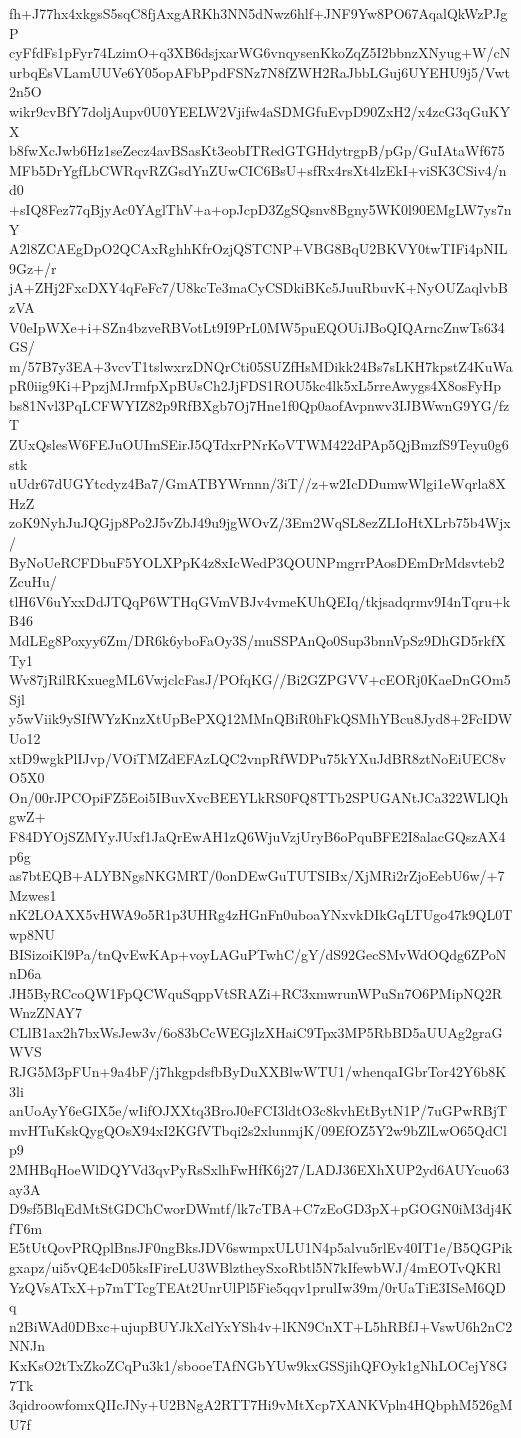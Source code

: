 fh+J77hx4xkgsS5sqC8fjAxgARKh3NN5dNwz6hlf+JNF9Yw8PO67AqalQkWzPJgP
cyFfdFs1pFyr74LzimO+q3XB6dsjxarWG6vnqysenKkoZqZ5I2bbnzXNyug+W/cN
urbqEsVLamUUVe6Y05opAFbPpdFSNz7N8fZWH2RaJbbLGuj6UYEHU9j5/Vwt2n5O
wikr9cvBfY7doljAupv0U0YEELW2Vjifw4aSDMGfuEvpD90ZxH2/x4zcG3qGuKYX
b8fwXcJwb6Hz1seZecz4avBSasKt3eobITRedGTGHdytrgpB/pGp/GuIAtaWf675
MFb5DrYgfLbCWRqvRZGsdYnZUwCIC6BsU+sfRx4rsXt4lzEkI+viSK3CSiv4/nd0
+sIQ8Fez77qBjyAc0YAglThV+a+opJcpD3ZgSQsnv8Bgny5WK0l90EMgLW7ys7nY
A2l8ZCAEgDpO2QCAxRghhKfrOzjQSTCNP+VBG8BqU2BKVY0twTIFi4pNIL9Gz+/r
jA+ZHj2FxcDXY4qFeFc7/U8kcTe3maCyCSDkiBKc5JuuRbuvK+NyOUZaqlvbBzVA
V0eIpWXe+i+SZn4bzveRBVotLt9I9PrL0MW5puEQOUiJBoQIQArncZnwTs634GS/
m/57B7y3EA+3vcvT1tslwxrzDNQrCti05SUZfHsMDikk24Bs7sLKH7kpstZ4KuWa
pR0iig9Ki+PpzjMJrmfpXpBUsCh2JjFDS1ROU5kc4lk5xL5rreAwygs4X8osFyHp
bs81Nvl3PqLCFWYIZ82p9RfBXgb7Oj7Hne1f0Qp0aofAvpnwv3IJBWwnG9YG/fzT
ZUxQslesW6FEJuOUImSEirJ5QTdxrPNrKoVTWM422dPAp5QjBmzfS9Teyu0g6stk
uUdr67dUGYtcdyz4Ba7/GmATBYWrnnn/3iT//z+w2IcDDumwWlgi1eWqrla8XHzZ
zoK9NyhJuJQGjp8Po2J5vZbJ49u9jgWOvZ/3Em2WqSL8ezZLIoHtXLrb75b4Wjx/
ByNoUeRCFDbuF5YOLXPpK4z8xIcWedP3QOUNPmgrrPAosDEmDrMdsvteb2ZcuHu/
tlH6V6uYxxDdJTQqP6WTHqGVmVBJv4vmeKUhQEIq/tkjsadqrmv9I4nTqru+kB46
MdLEg8Poxyy6Zm/DR6k6yboFaOy3S/muSSPAnQo0Sup3bnnVpSz9DhGD5rkfXTy1
Wv87jRilRKxuegML6VwjclcFasJ/POfqKG//Bi2GZPGVV+cEORj0KaeDnGOm5Sjl
y5wViik9ySIfWYzKnzXtUpBePXQ12MMnQBiR0hFkQSMhYBcu8Jyd8+2FcIDWUo12
xtD9wgkPlIJvp/VOiTMZdEFAzLQC2vnpRfWDPu75kYXuJdBR8ztNoEiUEC8vO5X0
On/00rJPCOpiFZ5Eoi5IBuvXvcBEEYLkRS0FQ8TTb2SPUGANtJCa322WLlQhgwZ+
F84DYOjSZMYyJUxf1JaQrEwAH1zQ6WjuVzjUryB6oPquBFE2I8alacGQszAX4p6g
as7btEQB+ALYBNgsNKGMRT/0onDEwGuTUTSIBx/XjMRi2rZjoEebU6w/+7Mzwes1
nK2LOAXX5vHWA9o5R1p3UHRg4zHGnFn0uboaYNxvkDIkGqLTUgo47k9QL0Twp8NU
BISizoiKl9Pa/tnQvEwKAp+voyLAGuPTwhC/gY/dS92GecSMvWdOQdg6ZPoNnD6a
JH5ByRCcoQW1FpQCWquSqppVtSRAZi+RC3xmwrunWPuSn7O6PMipNQ2RWnzZNAY7
CLlB1ax2h7bxWsJew3v/6o83bCcWEGjlzXHaiC9Tpx3MP5RbBD5aUUAg2graGWVS
RJG5M3pFUn+9a4bF/j7hkgpdsfbByDuXXBlwWTU1/whenqaIGbrTor42Y6b8K3li
anUoAyY6eGIX5e/wIifOJXXtq3BroJ0eFCI3ldtO3c8kvhEtBytN1P/7uGPwRBjT
mvHTuKskQygQOsX94xI2KGfVTbqi2s2xlunmjK/09EfOZ5Y2w9bZlLwO65QdClp9
2MHBqHoeWlDQYVd3qvPyRsSxlhFwHfK6j27/LADJ36EXhXUP2yd6AUYcuo63ay3A
D9sf5BlqEdMtStGDChCworDWmtf/lk7cTBA+C7zEoGD3pX+pGOGN0iM3dj4KfT6m
E5tUtQovPRQplBnsJF0ngBksJDV6swmpxULU1N4p5alvu5rlEv40IT1e/B5QGPik
gxapz/ui5vQE4cD05ksIFireLU3WBlztheySxoRbtl5N7kIfewbWJ/4mEOTvQKRl
YzQVsATxX+p7mTTcgTEAt2UnrUlPl5Fie5qqv1prulIw39m/0rUaTiE3ISeM6QDq
n2BiWAd0DBxc+ujupBUYJkXclYxYSh4v+lKN9CnXT+L5hRBfJ+VswU6h2nC2NNJn
KxKsO2tTxZkoZCqPu3k1/sbooeTAfNGbYUw9kxGSSjihQFOyk1gNhLOCejY8G7Tk
3qidroowfomxQIIcJNy+U2BNgA2RTT7Hi9vMtXcp7XANKVpln4HQbphM526gMU7f

